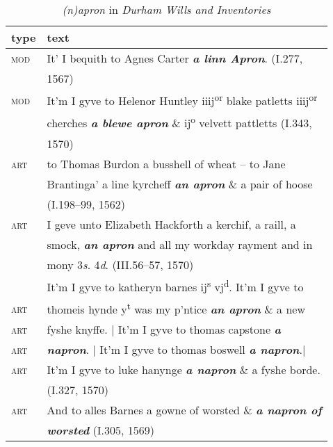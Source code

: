 \documentclass[output=paper,
modfonts
]{LSP/langsci}
\begin{document}
\begin{table}[ht]
\centering\caption{\emph{(n)apron} in \textit{Durham Wills and Inventories}}
\begin{tabular}{ll}
\toprule
type & text\\
\midrule

\textsc{mod} & It' I bequith to Agnes Carter \emph{\textbf{a linn
Apron}}. (I.277,\\
& 1567)\\

\textsc{mod} & It'm I gyve to Helenor Huntley iiij\textsuperscript{or} blake patletts iiij\textsuperscript{or}\\
& cherches \emph{\textbf{a blewe apron}} \& ij\textsuperscript{o} velvett pattletts (I.343, \\
& 1570)\\

\textsc{art} & to Thomas Burdon a busshell of wheat  -- to Jane\\
& Brantinga' a line kyrcheff \emph{\textbf{an apron}} \& a pair of hoose\\
& (I.198--99, 1562)\\

\textsc{art} & I geve unto Elizabeth Hackforth a kerchif, a raill, a\\
& smock, \emph{\textbf{an apron}} and all my workday rayment and in \\
& mony 3\emph{s}. 4\emph{d}. (III.56--57, 1570)\\
& It'm I gyve to katheryn barnes ij\textsuperscript{s} vj\textsuperscript{d}.  It'm I gyve to \\

\textsc{art} & thomeis hynde y\textsuperscript{t} was my p'ntice \emph{\textbf{an apron}} \& a new \\

\textsc{art} & fyshe knyffe. | It'm I gyve to thomas capstone \emph{\textbf{a}}\\
\textsc{art} & \emph{\textbf{napron}}. | It'm I gyve to thomas boswell \emph{\textbf{a napron}}.| \\
\textsc{art} & It'm I gyve to luke hanynge \emph{\textbf{a napron}} \& a fyshe borde. \\
& (I.327, 1570)\\
\textsc{art} & And to alles Barnes a gowne of worsted \& \textbf{\emph{a napron of}}\\
& \emph{\textbf{worsted}} (I.305, 1569)\\
\bottomrule
\end{tabular}
\end{table}
\end{document}
